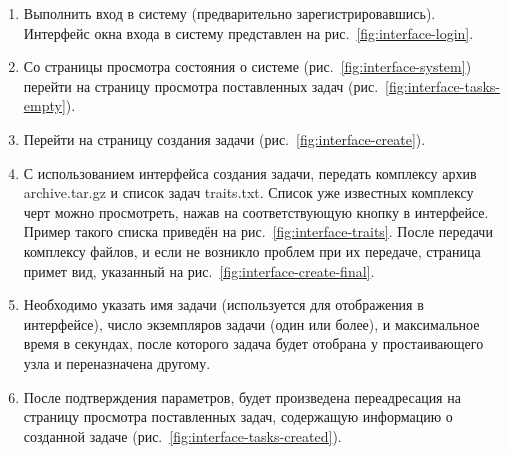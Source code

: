\documentclass[a4paper,12pt]{report}
\numberwithin{equation}{section}
\begin{document}
  \begin{enumerate}
    \item Выполнить вход в систему (предварительно зарегистрировавшись). Интерфейс окна входа в систему представлен на рис.~\ref{fig:interface-login}.
    \item Со страницы просмотра состояния о системе (рис.~\ref{fig:interface-system}) перейти на страницу просмотра поставленных задач (рис.~\ref{fig:interface-tasks-empty}).
    \item Перейти на страницу создания задачи (рис.~\ref{fig:interface-create}).
    \item С использованием интерфейса создания задачи, передать комплексу архив archive.tar.gz и список задач traits.txt.
    Список уже известных комплексу черт можно просмотреть, нажав на соответствующую кнопку в интерфейсе.
    Пример такого списка приведён на рис.~\ref{fig:interface-traits}.
    После передачи комплексу файлов, и если не возникло проблем при их передаче, страница примет вид, указанный на рис.~\ref{fig:interface-create-final}.
    \item Необходимо указать имя задачи (используется для отображения в интерфейсе), число экземпляров задачи (один или более), 
    и максимальное время в секундах, после которого задача будет отобрана у простаивающего узла и переназначена другому.
    \item После подтверждения параметров, будет произведена переадресация на страницу просмотра поставленных задач, содержащую информацию о созданной задаче (рис.~\ref{fig:interface-tasks-created}).
  \end{enumerate}
  
\end{document}
